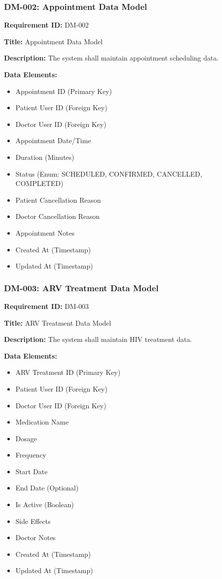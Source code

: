 \documentclass[12pt,a4paper]{article}
\begin{document}
\subsubsection{DM-002: Appointment Data Model}

\textbf{Requirement ID:} DM-002

\textbf{Title:} Appointment Data Model

\textbf{Description:} The system shall maintain appointment scheduling data.

\textbf{Data Elements:}
\begin{itemize}
    \item Appointment ID (Primary Key)
    \item Patient User ID (Foreign Key)
    \item Doctor User ID (Foreign Key)
    \item Appointment Date/Time
    \item Duration (Minutes)
    \item Status (Enum: SCHEDULED, CONFIRMED, CANCELLED, COMPLETED)
    \item Patient Cancellation Reason
    \item Doctor Cancellation Reason
    \item Appointment Notes
    \item Created At (Timestamp)
    \item Updated At (Timestamp)
\end{itemize}

\subsubsection{DM-003: ARV Treatment Data Model}

\textbf{Requirement ID:} DM-003

\textbf{Title:} ARV Treatment Data Model

\textbf{Description:} The system shall maintain HIV treatment data.

\textbf{Data Elements:}
\begin{itemize}
    \item ARV Treatment ID (Primary Key)
    \item Patient User ID (Foreign Key)
    \item Doctor User ID (Foreign Key)
    \item Medication Name
    \item Dosage
    \item Frequency
    \item Start Date
    \item End Date (Optional)
    \item Is Active (Boolean)
    \item Side Effects
    \item Doctor Notes
    \item Created At (Timestamp)
    \item Updated At (Timestamp)
\end{itemize}
\end{document}
